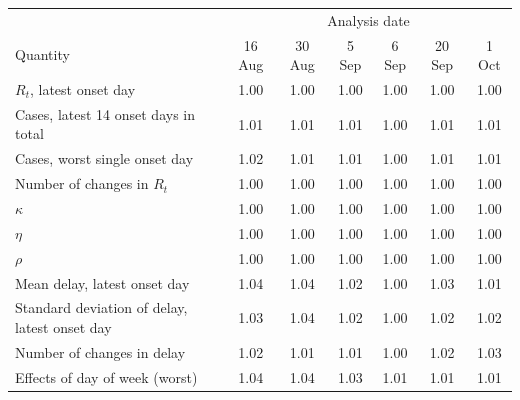 \begin{tabular}{lcccccc}
\toprule
 & \multicolumn{6}{c}{Analysis date} \\
Quantity & 16 Aug & 30 Aug & 5 Sep & 6 Sep & 20 Sep & 1 Oct \\
\midrule
$R_t$, latest onset day & 1.00 & 1.00 & 1.00 & 1.00 & 1.00 & 1.00 \\
Cases, latest 14 onset days in total & 1.01 & 1.01 & 1.01 & 1.00 & 1.01 & 1.01 \\
Cases, worst single onset day & 1.02 & 1.01 & 1.01 & 1.00 & 1.01 & 1.01 \\
Number of changes in $R_t$ & 1.00 & 1.00 & 1.00 & 1.00 & 1.00 & 1.00 \\
$\kappa$ & 1.00 & 1.00 & 1.00 & 1.00 & 1.00 & 1.00 \\
$\eta$ & 1.00 & 1.00 & 1.00 & 1.00 & 1.00 & 1.00 \\
$\rho$ & 1.00 & 1.00 & 1.00 & 1.00 & 1.00 & 1.00 \\
\addlinespace
Mean delay, latest onset day & 1.04 & 1.04 & 1.02 & 1.00 & 1.03 & 1.01 \\
Standard deviation of delay, latest onset day & 1.03 & 1.04 & 1.02 & 1.00 & 1.02 & 1.02 \\
Number of changes in delay & 1.02 & 1.01 & 1.01 & 1.00 & 1.02 & 1.03 \\
Effects of day of week (worst) & 1.04 & 1.04 & 1.03 & 1.01 & 1.01 & 1.01 \\
\bottomrule
\end{tabular}
